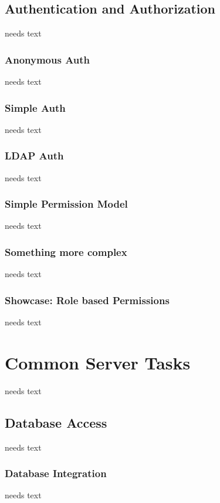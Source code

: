 \documentclass[a4paper,10pt,twoside]{book}
\begin{document}
\section{Authentication and Authorization}
needs text

\subsection{Anonymous Auth}
needs text

\subsection{Simple Auth}
needs text

\subsection{LDAP Auth}
needs text

\subsection{Simple Permission Model}
needs text

\subsection{Something more complex}
needs text

\subsection{Showcase: Role based Permissions}
needs text

\chapter{Common Server Tasks}
needs text
  
\section{Database Access}
needs text

\subsection{Database Integration}
needs text
\end{document}
